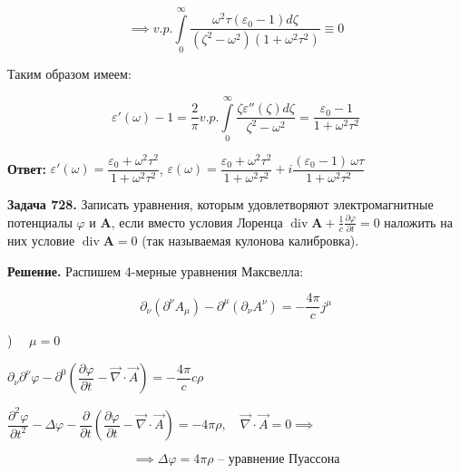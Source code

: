 \documentclass[a4paper,12pt]{article}
\begin{document}
	\begin{equation}
		\implies v.p. \displaystyle\int\limits_{0}^{\infty} \dfrac{\omega^2 \tau (\varepsilon_0 - 1)d\zeta}{(\zeta^2 - \omega^2) (1+\omega^2\tau^2)} \equiv 0
	\end{equation}
	
	\quad Таким образом имеем:
	
	\begin{equation}
		\varepsilon'(\omega) - 1 = \dfrac{2}{\pi} v.p. \displaystyle\int\limits_{0}^{\infty} \dfrac{\zeta\varepsilon''(\zeta)d\zeta}{\zeta^2 - \omega^2} = \dfrac{\varepsilon_0 - 1}{1+\omega^2\tau^2}
	\end{equation}
	
	\quad \textbf{Ответ:} $\varepsilon'(\omega) = \dfrac{\varepsilon_0 + \omega^2\tau^2}{1+\omega^2\tau^2}$, $\varepsilon(\omega) = \dfrac{\varepsilon_0 + \omega^2\tau^2}{1+\omega^2\tau^2} + i\dfrac{(\varepsilon_0 - 1) \, \omega \tau}{1 + \omega^2 \tau^2}$
	
	\quad \textbf{Задача 728.} Записать уравнения, которым удовлетворяют электромагнитные потенциалы $\varphi$ и $\mathbf{A}$, если вместо условия Лоренца 
	$\operatorname{div} \mathbf{A} + \frac{1}{c} \frac{\partial \varphi}{\partial t} = 0$ наложить на них условие $\operatorname{div} \mathbf{A} = 0$ (так называемая кулонова калибровка).
	
	\quad \textbf{Решение.} Распишем 4-мерные уравнения Максвелла:
	
	\begin{equation}
		\partial_\nu \left(\partial^\nu A_\mu\right) - \partial^\mu \left(\partial_\nu A^\nu\right) = -\dfrac{4\pi }{c} j^\mu 
	\end{equation}
	
	) $\quad \mu = 0$

	\begin{center}
		$\partial_\nu \partial^\nu \varphi - \partial^0 \left(\dfrac{\partial \varphi}{\partial t} - \vec{\nabla}\cdot \vec{A}\right) = -\dfrac{4\pi}{c} c\rho$
		
		$\dfrac{\partial^2 \varphi}{\partial t^2} - \Delta\varphi - \dfrac{\partial}{\partial t} \left(\dfrac{\partial \varphi}{\partial t} - \vec{\nabla}\cdot \vec{A}\right) = -4\pi\rho, \quad \vec{\nabla} \cdot \vec{A} = 0 \implies$
	\end{center}	
	
	\begin{equation}
		\implies \Delta \varphi = 4\pi\rho \text{ -- уравнение Пуассона}
	\end{equation}
	
\end{document}
